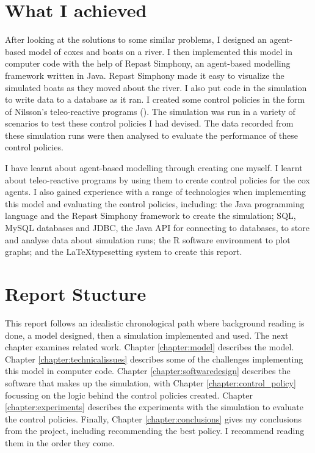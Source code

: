   \section{What I achieved}
  After looking at the solutions to some similar problems, I designed an agent-based model of coxes and boats on a river. I then implemented this model in computer code with the help of Repast Simphony, an agent-based modelling framework written in Java. Repast Simphony made it easy to visualize the simulated boats as they moved about the river. I also put code in the simulation to write data to a database as it ran. I created some control policies in the form of Nilsson's teleo-reactive programs (\cite{Nilsson1994}). The simulation was run in a variety of scenarios to test these control policies I had devised. The data recorded from these simulation runs were then analysed to evaluate the performance of these control policies.
  
  I have learnt about agent-based modelling through creating one myself. I learnt about teleo-reactive programs by using them to create control policies for the cox agents. I also gained experience with a range of technologies when implementing this model and evaluating the control policies, including: the Java programming language and the Repast Simphony framework to create the simulation; SQL, MySQL databases and JDBC, the Java API for connecting to databases, to store and analyse data about simulation runs; the R software environment to plot graphs; and the \LaTeX typesetting system to create this report.
  
  \section{Report Stucture}
  This report follows an idealistic chronological path where background reading is done, a model designed, then a simulation implemented and used. The next chapter examines related work. Chapter \ref{chapter:model} describes the model. Chapter \ref{chapter:technicalissues} describes some of the challenges implementing this model in computer code. Chapter \ref{chapter:softwaredesign} describes the software that makes up the simulation, with Chapter \ref{chapter:control_policy} focussing on the logic behind the control policies created. Chapter \ref{chapter:experiments} describes the experiments with the simulation to evaluate the control policies. Finally, Chapter \ref{chapter:conclusions} gives my conclusions from the project, including recommending the best policy. I recommend reading them in the order they come.
